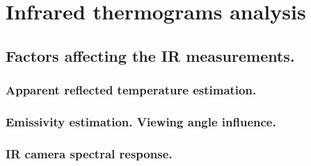 \pagestyle{standard}

\chapter{Infrared thermograms analysis}\label{chapter3}

	\thispagestyle{chapter-first-page}

	\section{Factors affecting the IR measurements.}\label{section3.1}
	
		\subsection{Apparent reflected temperature estimation.}\label{section3.1.1}
	
		\subsection{Emissivity estimation. Viewing angle influence.}\label{section3.1.2}
		
		\subsection{IR camera spectral response.}\label{section3.1.3}
		
		
	